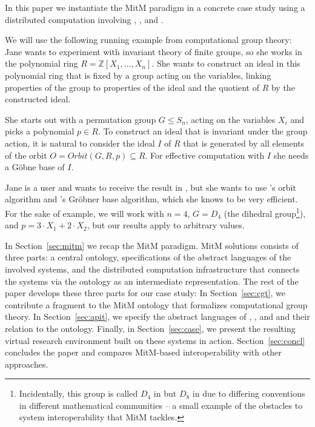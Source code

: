 In this paper we instantiate the MitM paradigm in a concrete case study using a distributed computation involving \GAP, \Sage, and \Singular.

We will use the following running example from computational group theory: Jane wants to experiment with invariant theory of finite groups, so she works in the
polynomial ring $R=\mathbb{Z}[X_1,\ldots,X_n]$.
She wants to construct an ideal in this polynomial ring that is fixed by a group acting on the variables, linking properties of the group to properties of the ideal and the quotient of $R$ by the constructed ideal.

She starts out with a permutation group $G \leq S_n$, acting on the variables $X_i$ and picks a polynomial $p \in R$. To construct an ideal that is invariant under the group action, it is natural to consider the ideal $I$ of $R$ that is
generated by all elements of the orbit $O=Orbit(G,R,p)\subseteq R$. 
For 
effective computation with $I$ she needs a G\"obne base of $I$.

Jane is a \Sage user and wants to receive the result in \Sage, but she wants to
use \GAP's orbit algorithm and \Singular's Gr\"obner base algorithm, which she
knows to be very efficient. For the sake of example, we will work with $n=4$,
$G=D_4$ (the dihedral group\footnote{Incidentally, this group is called $D_4$ in
\Sage but $D_8$ in \GAP due to differing conventions in different mathematical
communities -- a small example of the obstacles to system interoperability that
MitM tackles.}), and $p=3\cdot X_1+2\cdot X_2$, but our results apply to
arbitrary values.

In Section~\ref{sec:mitm} we recap the MitM paradigm.
MitM solutions consists of three parts: a central ontology, specifications of the abstract languages of the involved systems, and the distributed computation infrastructure that connects the systems via the ontology as an intermediate representation.
The rest of the paper develops these three parts for our case study:
In Section~\ref{sec:cgt}, we contribute a fragment to the MitM ontology that formalizes computational group theory.
In Section~\ref{sec:apit}, we specify the abstract languages of \GAP, \Sage, and \Singular and their relation to the ontology.
Finally, in Section~\ref{sec:case}, we present the resulting virtual research environment built on these systems in action.
Section~\ref{sec:concl} concludes the paper and compares MitM-based interoperability with other approaches.


